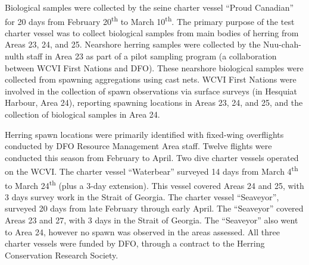 Biological samples were collected by the seine charter vessel ``Proud Canadian'' for 20 days from February 20\textsuperscript{th} to March 10\textsuperscript{th}.
The primary purpose of the test charter vessel was to collect biological samples from main bodies of herring from Areas 23, 24, and 25. 
Nearshore herring samples were collected by the Nuu-chah-nulth staff in Area 23 as part of a pilot sampling program (a collaboration between WCVI First Nations and DFO). 
These nearshore biological samples were collected from spawning aggregations using cast nets.
WCVI First Nations were involved in the collection of spawn observations via surface surveys (in Hesquiat Harbour, Area 24), reporting spawning locations in Areas 23, 24, and 25, and the collection of biological samples in Area 24. 

Herring spawn locations were primarily identified with fixed-wing overflights conducted by DFO Resource Management Area staff. 
Twelve flights were conducted this season from February to April. 
Two dive charter vessels operated on the WCVI. 
The charter vessel ``Waterbear'' surveyed 14 days from March 4\textsuperscript{th} to March 24\textsuperscript{th} (plus a 3-day extension). 
This vessel covered Areas 24 and 25, with 3 days survey work in the Strait of Georgia. 
The charter vessel ``Seaveyor'', surveyed 20 days from late February through early April.  
The ``Seaveyor'' covered Areas 23 and 27, with 3 days in the Strait of Georgia.
The ``Seaveyor'' also went to Area 24, however no spawn was observed in the areas assessed.
All three charter vessels were funded by DFO, through a contract to the Herring Conservation Research Society.